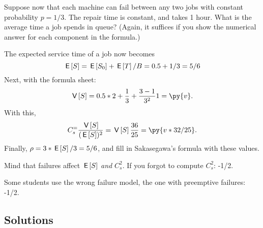 \begin{exercise}[201807]{1}
Suppose now that each machine can fail between any two jobs with constant probability $p=1/3$. The repair time is constant, and takes 1 hour.  What is the average time a job spends in queue? (Again, it suffices if you show the numerical answer for each component in the formula.)
\begin{solution}
  The expected service time of a job now becomes 
  \begin{equation*}
    \,\mathsf{E}\left[S\right] = \,\mathsf{E}\left[S_0\right] + \,\mathsf{E}\left[T\right]/B = 0.5 + 1/3 = 5/6
  \end{equation*}
Next, with the formula sheet: 
\begin{equation*}
\V{S} = 0.5*2 + \frac 1 3 + \frac{3-1}{3^2} 1 = \py{v}.
\end{equation*}
With this, 
\begin{equation*}
  C_s^ = \frac{\V{S}}{(\E S)^2} = \V{S}\frac{36}{25} = \py{v*32/25}.
\end{equation*}
Finally, $\rho = 3*\,\mathsf{E}\left[S\right] / 3 = 5/6$, and fill in Sakasegawa's formula with these values.

Mind that failures affect $\,\mathsf{E}\left[S\right]$ \emph{and} $C_s^2$. If you forgot to compute $C_s^2$: -1/2.

Some students use the wrong failure model, the one with preemptive failures: -1/2.
\end{solution}
\end{exercise}



\subsection*{Solutions}




